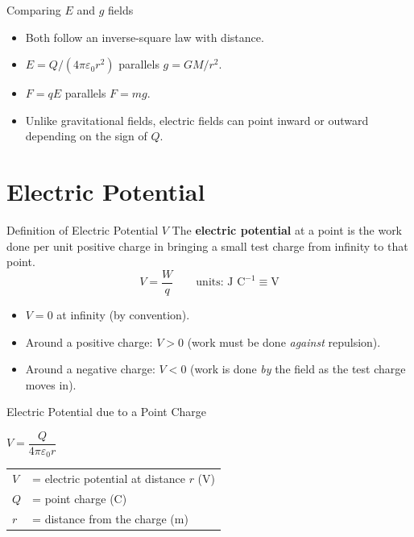 \begin{keybox}{Comparing $E$ and $g$ fields}
\begin{itemize}[itemsep=2pt]
  \item Both follow an inverse-square law with distance.
  \item $E = Q/(4\pi\varepsilon_0 r^2)$ parallels $g = GM/r^2$.
  \item $F = qE$ parallels $F = mg$.
  \item Unlike gravitational fields, electric fields can point inward or outward depending on the sign of $Q$.
\end{itemize}
\end{keybox}

\section{Electric Potential}

\begin{definitionbox}{Definition of Electric Potential $V$}
The \textbf{electric potential} at a point is the work done per unit positive charge in bringing a small test charge from infinity to that point.
$$V = \frac{W}{q} \qquad \text{units: J C}^{-1} \equiv \text{V}$$
\begin{itemize}[itemsep=2pt]
  \item $V = 0$ at infinity (by convention).
  \item Around a positive charge: $V > 0$ (work must be done \emph{against} repulsion).
  \item Around a negative charge: $V < 0$ (work is done \emph{by} the field as the test charge moves in).
\end{itemize}
\end{definitionbox}

\begin{formulabox}{Electric Potential due to a Point Charge}
\begin{center}
\Large $V = \dfrac{Q}{4\pi\varepsilon_0 r}$
\end{center}
\vspace{0.3em}
\begin{tabular}{@{}ll@{}}
$V$ & = electric potential at distance $r$ (V) \\
$Q$ & = point charge (C) \\
$r$ & = distance from the charge (m) \\
\end{tabular}
\end{formulabox}

